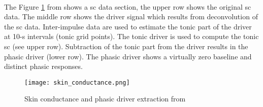 \\
The Figure \ref{fig:skin_conductance} from \cite{benedek2010continuous} shows a \gls{sc} data section, the upper row shows the original \gls{sc} data. The middle row shows the driver signal which results from deconvolution of the \gls{sc} data. Inter-impulse data are used to estimate the tonic part of the driver at 10-s intervals (tonic grid points). The tonic driver is used to compute the tonic \gls{sc} (see upper row). Subtraction of the tonic part from the driver results in the phasic driver (lower row). The phasic driver shows a virtually zero baseline and distinct phasic responses. 
\begin{figure}[h]
    \centering
    \texttt{[image: skin\_conductance.png]} 
	\caption{Skin conductance and phasic driver extraction from \cite{benedek2010continuous}}
    \label{fig:skin_conductance}
\end{figure}

